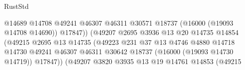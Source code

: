 \begin{lexlean}{RustStd}
\begin{coremodule}
                                                      @14689
                                                      @14708
                                                      @49241
                                                      @46307
                                                      @46311
                                                      @30571
                                                      @18737
                                                      (@16000 (@19093 @14708 @14690))
                                                      @17847))
                                                  (@49207
                                                    @2695
                                                    @3936
                                                    @13
                                                    @20
                                                    @14735
                                                    @14854
                                                    (@49215
                                                      @2695
                                                      @13
                                                      @14735
                                                      (@49223
                                                        @231
                                                        @37
                                                        @13
                                                        @4746
                                                        @4880
                                                        @14718
                                                        @14730
                                                        @49241
                                                        @46307
                                                        @46311
                                                        @30642
                                                        @18737
                                                        (@16000 (@19093 @14730 @14719))
                                                        @17847))
                                                    (@49207
                                                      @3820
                                                      @3935
                                                      @13
                                                      @19
                                                      @14761
                                                      @14853
                                                      (@49215

\end{coremodule}
\end{lexlean}
